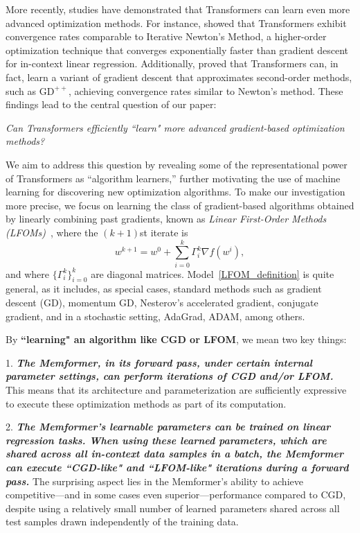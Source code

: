 \documentclass[11pt]{article}
\numberwithin{equation}{section}
\begin{document}
More recently, studies have demonstrated that Transformers can learn even more advanced optimization methods. For instance, \citet{fu2023transformers} showed that Transformers exhibit convergence rates comparable to Iterative Newton's Method, a higher-order optimization technique that converges exponentially faster than gradient descent for in-context linear regression. Additionally, \citet{vladymyrov2024linear} proved that Transformers can, in fact, learn a variant of gradient descent that approximates second-order methods, such as \(\mathrm{GD}^{++}\), achieving convergence rates similar to Newton's method. These findings lead to the central question of our paper:

\begin{center}
    \emph{Can Transformers efficiently ``learn" more advanced gradient-based optimization methods?}
\end{center}

We aim to address this question by revealing some of the representational power of Transformers as ``algorithm learners,'' further motivating the use of machine learning for discovering new optimization algorithms. To make our investigation more precise, we focus on learning the class of gradient-based algorithms obtained by linearly combining past gradients, known as \emph{Linear First-Order Methods (LFOMs)}~\citep{goh2017why}, where the \((k+1)\)st iterate is
\begin{equation}
w^{k+1} = w^0 + \sum_{i=0}^k \Gamma_i^k \nabla f(w^i),
\label{LFOM_definition}
\end{equation}
and where \(\{\Gamma_i^k\}_{i=0}^k\) are diagonal matrices. Model~\eqref{LFOM_definition} is quite general, as it includes, as special cases, standard methods such as gradient descent (GD), momentum GD, Nesterov's accelerated gradient, conjugate gradient, and in a stochastic setting, AdaGrad, ADAM, among others.

By \textbf{``learning" an algorithm like CGD or LFOM}, we mean two key things:

1. \textbf{\textit{The Memformer, in its forward pass, under certain internal parameter settings, can perform iterations of CGD and/or LFOM.}} This means that its architecture and parameterization are sufficiently expressive to execute these optimization methods as part of its computation.

2. \textbf{\textit{The Memformer's learnable parameters can be trained on linear regression tasks. When using these learned parameters, which are shared across all in-context data samples in a batch, the Memformer can execute ``CGD-like" and ``LFOM-like" iterations during a forward pass.}} The surprising aspect lies in the Memformer's ability to achieve competitive—and in some cases even superior—performance compared to CGD, despite using a relatively small number of learned parameters shared across all test samples drawn independently of the training data.
\end{document}

